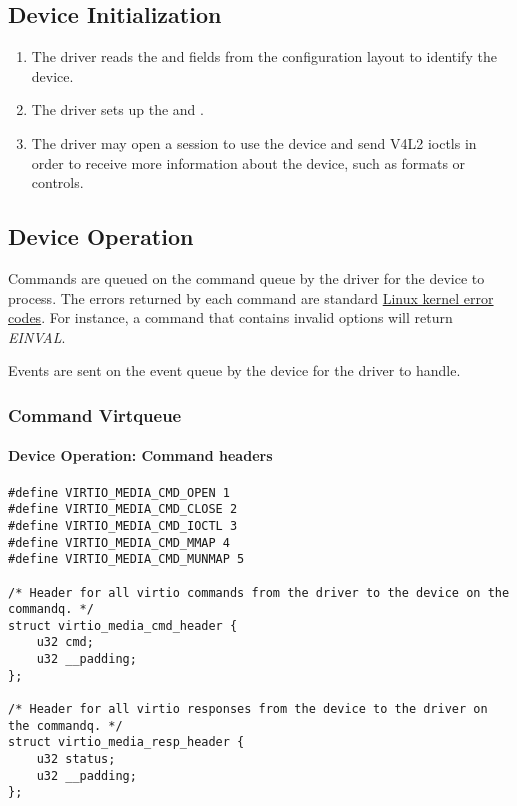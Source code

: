 \subsection{Device Initialization}

\begin{enumerate}
\item The driver reads the  and  fields
from the configuration layout to identify the device.
\item The driver sets up the  and .
\item The driver may open a session to use the device and send V4L2 ioctls in
order to receive more information about the device, such as formats or controls.
\end{enumerate}

\subsection{Device Operation}\label{sec:Device Types / Media Device / Device Operation}

Commands are queued on the command queue by the driver for the device to
process. The errors returned by each command are standard
\href{https://www.kernel.org/doc/html/latest/userspace-api/media/gen-errors.html}{Linux kernel error codes}.
For instance, a command that contains invalid options will return \textit{EINVAL}.

Events are sent on the event queue by the device for the driver to handle.

\subsubsection{Command Virtqueue}

\paragraph{Device Operation: Command headers}

\begin{lstlisting}
#define VIRTIO_MEDIA_CMD_OPEN 1
#define VIRTIO_MEDIA_CMD_CLOSE 2
#define VIRTIO_MEDIA_CMD_IOCTL 3
#define VIRTIO_MEDIA_CMD_MMAP 4
#define VIRTIO_MEDIA_CMD_MUNMAP 5

/* Header for all virtio commands from the driver to the device on the commandq. */
struct virtio_media_cmd_header {
	u32 cmd;
	u32 __padding;
};

/* Header for all virtio responses from the device to the driver on the commandq. */
struct virtio_media_resp_header {
	u32 status;
	u32 __padding;
};
\end{lstlisting}

